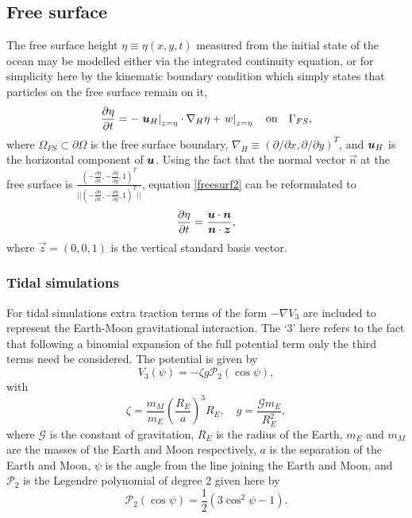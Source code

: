 \subsection{Free surface}\label{Sect:FS}
The free surface height $\eta\equiv\eta(x,y,t)$ measured from the initial state of the ocean
may be modelled either via the integrated continuity equation,
or for simplicity here by the kinematic boundary condition which simply states
that particles on the free surface remain on it, \ie
\begin{equation}\label{freesurf2}
\frac{\partial \eta}{\partial t}=-\left.{{\mbox{\boldmath$u$}}}_H\right|_{z=\eta}\cdot\nabla_H \eta +\left.w\right|_{z=\eta} \quad \textrm{on}\quad \Gamma_{FS},
\end{equation}
where $\Omega_{FS}\subset \partial \Omega$ is the free surface boundary, $\nabla_H\equiv(\partial/\partial x,\partial/\partial y)^T$, and
${\mbox{\boldmath$u$}}_H$ is the horizontal component of ${\mbox{\boldmath$u$}}$. Using the fact that the normal vector $\vec n$ at the free surface is $\frac{(-\frac{\partial \eta}{\partial x},-\frac{\partial \eta}{\partial y}, 1)^T}{||(-\frac{\partial \eta}{\partial x},-\frac{\partial \eta}{\partial y}, 1)^T||}$, equation \eqref{freesurf2} can be reformulated to
\begin{equation}\label{freesurf3}
\frac{\partial \eta}{\partial t}=\frac{{\mbox{\boldmath$u$}} \cdot {\mbox{\boldmath$n$}}}{{\mbox{\boldmath$n$}} \cdot {\mbox{\boldmath$z$}}},
\end{equation}
where $\vec z=(0,0,1)$ is the vertical standard basis vector.



\subsubsection{Tidal simulations}\label{sect:tidal}
For tidal simulations extra traction terms
of the form $-\nabla V_3$ are included to represent the Earth-Moon gravitational
interaction. The `3' here refers to the fact that following a
binomial expansion of the full potential term only the third terms
need be considered. The potential is given by
\begin{equation}
V_3(\psi) = -\zeta g \mathcal{P}_2(\cos\psi),
\end{equation}
with
\begin{equation}
\zeta = \frac{m_M}{m_E}\left(\frac{R_E}{a}\right)^3R_E,\quad
g=\frac{\mathcal{G}m_E}{R_E^2},
\end{equation}
where $\mathcal{G}$ is the constant of gravitation, $R_E$ is the
radius of the Earth, $m_E$ and $m_M$ are the masses of the Earth and
Moon respectively, $a$ is the separation of the Earth and Moon,
$\psi$ is the angle from the line joining the Earth and Moon, and
$\mathcal{P}_2$ is the Legendre polynomial of degree 2 given here by
\begin{equation}
\mathcal{P}_2(\cos\psi)=\frac{1}{2}(3\cos^2\psi -1).
\end{equation}

